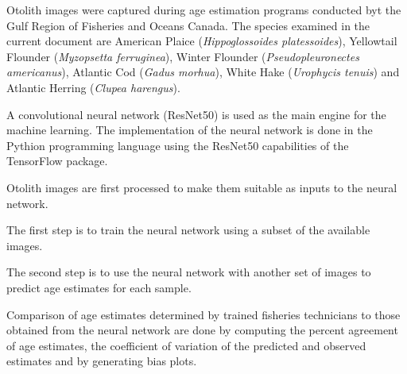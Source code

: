 

Otolith images were captured during age estimation programs conducted byt the Gulf Region of Fisheries and Oceans Canada. The species examined in the current document are American Plaice (\emph{Hippoglossoides platessoides}), Yellowtail Flounder (\emph{Myzopsetta ferruginea}), Winter Flounder (\emph{Pseudopleuronectes americanus}), Atlantic Cod (\emph{Gadus morhua}), White Hake (\emph{Urophycis tenuis}) and Atlantic Herring (\emph{Clupea harengus}).

A convolutional neural network (ResNet50) is used as the main engine for the machine learning. The implementation of the neural network is done in the Pythion programming language using the ResNet50 capabilities of the TensorFlow package.

Otolith images are first processed to make them suitable as inputs to the neural network.

The first step is to train the neural network using a subset of the available images.

The second step is to use the neural network with another set of images to predict age estimates for each sample.

Comparison of age estimates determined by trained fisheries technicians to those obtained from the neural network are done by computing the percent agreement of age estimates, the coefficient of variation of the predicted and observed estimates and by generating bias plots.


